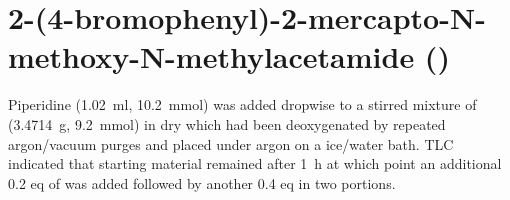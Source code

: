 
\section{2-(4-bromophenyl)-2-mercapto-N-methoxy-N-methylacetamide ()}

Piperidine (\SI{1.02}{\milli\litre}, \SI{10.2}{\milli\mol}) was added dropwise to a stirred mixture of  (\SI{3.4714}{\gram}, \SI{9.2}{\milli\mol}) in dry  which had been deoxygenated by repeated argon/vacuum purges and placed under argon on a ice/water bath. TLC indicated that starting material remained after \SI{1}{\hour} at which point an additional 0.2 eq of  was added followed by another 0.4 eq in two portions.

